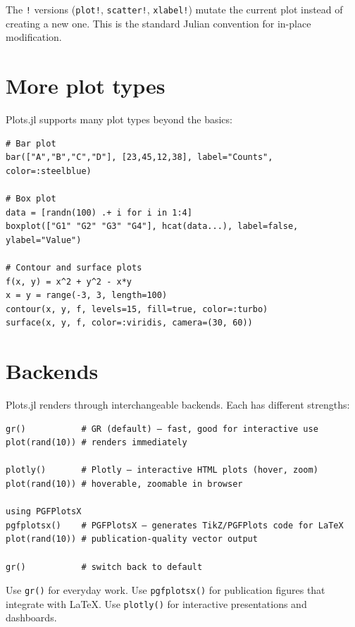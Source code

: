 \begin{juliatip}
The \texttt{!} versions (\texttt{plot!}, \texttt{scatter!}, \texttt{xlabel!}) mutate the current plot instead of creating a new one. This is the standard Julian convention for in-place modification.
\end{juliatip}

\section{More plot types}

Plots.jl supports many plot types beyond the basics:

\begin{verbatim}
# Bar plot
bar(["A","B","C","D"], [23,45,12,38], label="Counts", color=:steelblue)

# Box plot
data = [randn(100) .+ i for i in 1:4]
boxplot(["G1" "G2" "G3" "G4"], hcat(data...), label=false, ylabel="Value")

# Contour and surface plots
f(x, y) = x^2 + y^2 - x*y
x = y = range(-3, 3, length=100)
contour(x, y, f, levels=15, fill=true, color=:turbo)
surface(x, y, f, color=:viridis, camera=(30, 60))
\end{verbatim}

\section{Backends}

Plots.jl renders through interchangeable backends. Each has different strengths:

\begin{verbatim}
gr()           # GR (default) — fast, good for interactive use
plot(rand(10)) # renders immediately

plotly()       # Plotly — interactive HTML plots (hover, zoom)
plot(rand(10)) # hoverable, zoomable in browser

using PGFPlotsX
pgfplotsx()    # PGFPlotsX — generates TikZ/PGFPlots code for LaTeX
plot(rand(10)) # publication-quality vector output

gr()           # switch back to default
\end{verbatim}

\begin{juliatip}
Use \texttt{gr()} for everyday work. Use \texttt{pgfplotsx()} for publication figures that integrate with \LaTeX. Use \texttt{plotly()} for interactive presentations and dashboards.
\end{juliatip}

